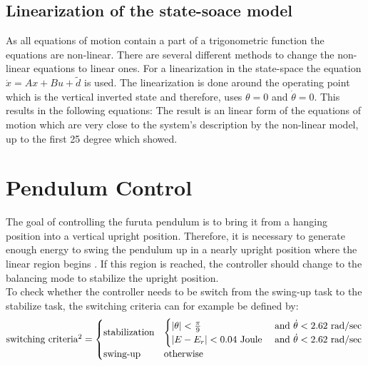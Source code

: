 \subsection{Linearization of the state-soace model}
As all equations of motion contain a part of a trigonometric function the 
equations are non-linear. There are several different methods to change the 
non-linear equations to linear ones. %
 For a linearization in the state-space the equation 
$\dot{x}=Ax+Bu+\tilde{d}$ is used. The linearization is done around the 
operating point \cite{rigatos2018nonlinear} which is the vertical inverted 
state and therefore, uses $\theta = 0$ and $\dot{\theta}=0$. This results in 
the following equations:
The result is an linear form of the equations of motion which are very close to 
the system's description by the non-linear model, up to the first 25 degree 
which \citeauthor{kurode2011swing} showed.

\section{Pendulum Control}
The goal of controlling the furuta pendulum is to bring it from a hanging 
position into a vertical upright position. Therefore, it is necessary to 
generate enough energy to swing the pendulum up in a nearly upright position 
where the linear region begins \cite{kurode2011swing}. If this region is 
reached, the controller should change to the balancing mode to stabilize the 
upright position.\\
To check whether the controller needs to be switch from the swing-up task to 
the stabilize task, the switching criteria can for example be defined by:
\begin{align*}
\text{switching criteria}\footnotemark[2] =
\begin{cases} \text{stabilization} &\begin{cases}
|\theta|< \frac{\pi}{9} \ &\text{and}\  \dot{\theta} < 2.62\  \text{rad/sec}\\
|E-E_r|< 0.04 \ \text{Joule}\ &\text{and}\  \dot{\theta} < 2.62\  \text{rad/sec}
\end{cases}\\
\text{swing-up} & \text{otherwise}
\end{cases}
\end{align*}
